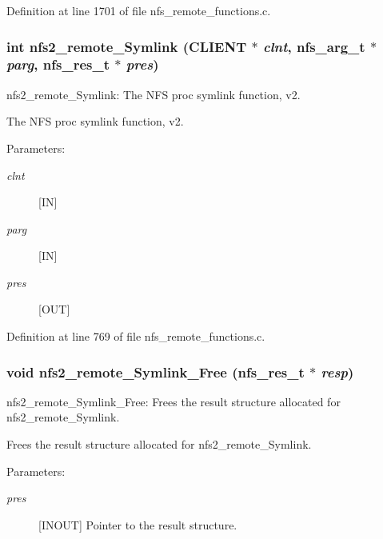 Definition at line 1701 of file nfs\_\-remote\_\-functions.c.
\subsubsection[{nfs2\_\-remote\_\-Symlink}]{\setlength{\rightskip}{0pt plus 5cm}int nfs2\_\-remote\_\-Symlink (CLIENT $\ast$ {\em clnt}, \/  nfs\_\-arg\_\-t $\ast$ {\em parg}, \/  nfs\_\-res\_\-t $\ast$ {\em pres})}\label{group__NFSprocs_g8a4b4d07a726900e8738f34f0203af4c}


nfs2\_\-remote\_\-Symlink: The NFS proc symlink function, v2.

The NFS proc symlink function, v2.

\begin{Desc}
\item[Parameters:]
\begin{description}
\item[{\em clnt}][IN] \item[{\em parg}][IN] \item[{\em pres}][OUT] \end{description}
\end{Desc}


Definition at line 769 of file nfs\_\-remote\_\-functions.c.
\subsubsection[{nfs2\_\-remote\_\-Symlink\_\-Free}]{\setlength{\rightskip}{0pt plus 5cm}void nfs2\_\-remote\_\-Symlink\_\-Free (nfs\_\-res\_\-t $\ast$ {\em resp})}\label{group__NFSprocs_g45ccfcae0d87c0ff09d19de18f0ce1ff}


nfs2\_\-remote\_\-Symlink\_\-Free: Frees the result structure allocated for nfs2\_\-remote\_\-Symlink.

Frees the result structure allocated for nfs2\_\-remote\_\-Symlink.

\begin{Desc}
\item[Parameters:]
\begin{description}
\item[{\em pres}][INOUT] Pointer to the result structure. \end{description}
\end{Desc}


